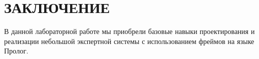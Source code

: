 \section*{ЗАКЛЮЧЕНИЕ}

В данной лабораторной работе мы приобрели базовые навыки проектирования
и реализации небольшой экспертной системы с использованием фреймов на языке Пролог.

\newpage